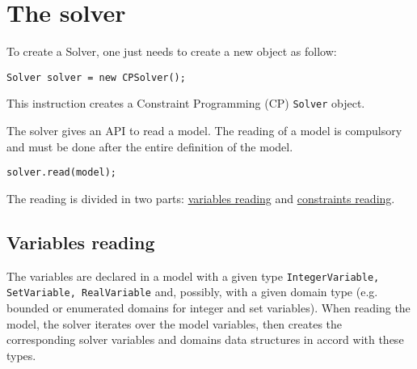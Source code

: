 \label{solver}
\hypertarget{solver}{}


\chapter{The solver}\label{solver:thesolver}\hypertarget{solver:thesolver}{}




To create a \gls{Solver}, one just needs to create a new object as follow:
\begin{lstlisting}
Solver solver = new CPSolver();
\end{lstlisting}
This instruction creates a Constraint Programming (CP) {\tt Solver} object.

The solver gives an API to read a model. The reading of a model is compulsory and must be done after the entire definition of the model. 
\begin{lstlisting}
solver.read(model);
\end{lstlisting}
The reading is divided in two parts: \hyperlink{solver:variablesreading}{variables reading} and \hyperlink{solver:constraintsreading}{constraints reading}.

\section{Variables reading}\label{solver:variablesreading}\hypertarget{solver:variablesreading}{}
The variables are declared in a model with a given type \texttt{IntegerVariable, SetVariable, RealVariable} and, possibly, with a given domain type (e.g. bounded or enumerated domains for integer and set variables).
When reading the model, the solver iterates over the model variables, then creates the corresponding solver variables and domains data structures in accord with these types.

